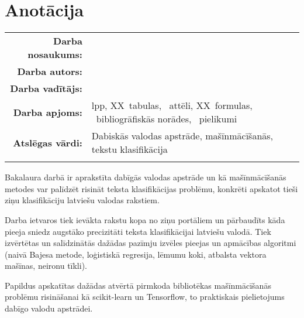 \documentclass{VEA}
\newcounter{nofappendices}
\begin{document}

\tableofcontents
\clearpage


\pagestyle{plain}
\setcounter{page}{4}
\chapter*{Anotācija}

\begin{tabular}{@{}r@{}l@{}}
\parbox[c]{0.3\textwidth}{\textbf{Darba nosaukums:}}&
\parbox[t]{0.65\textwidth}{} \\
\parbox[c]{0.3\textwidth}{\textbf{Darba autors:}}&
\parbox[t]{0.65\textwidth}{} \\
\parbox[c]{0.3\textwidth}{\textbf{Darba vadītājs:}}&
\parbox[t]{0.65\textwidth}{} \\
\parbox[c]{0.3\textwidth}{\textbf{Darba apjoms:}}&
\parbox[t]{0.65\textwidth}{\textcolor{black}{\pageref{LastPage}} lpp, XX~tabulas,  ~attēli, XX~formulas, ~bibliogrāfiskās norādes, ~pielikumi} \\
\parbox[c]{0.3\textwidth}{\textbf{Atslēgas vārdi:}}&
\parbox[t]{0.65\textwidth}{Dabiskās valodas apstrāde, mašīnmācīšanās, tekstu klasifikācija} \\
&\\
\end{tabular}

Bakalaura darbā ir aprakstīta dabīgās valodas apstrāde un kā mašīnmācīšanās metodes var palīdzēt risināt teksta klasifikācijas problēmu, konkrēti apskatot tieši ziņu klasifikāciju latviešu valodas rakstiem.

Darba ietvaros tiek ievākta rakstu kopa no ziņu portāliem un pārbaudīts kāda pieeja sniedz augstāko precizitāti teksta klasifikācijai latviešu valodā. Tiek izvērtētas un salīdzinātās dažādas pazīmju izvēles pieejas un apmācības algoritmi (naivā Bajesa metode, loģistiskā regresija, lēmumu koki, atbalsta vektora mašīnas, neironu tīkli).

Papildus apskatītas dažādas atvērtā pirmkoda bibliotēkas mašīnmācīšanās problēmu risināšanai kā scikit-learn un Tensorflow, to praktiskais pielietojums dabīgo valodu apstrādei.
\end{document}
